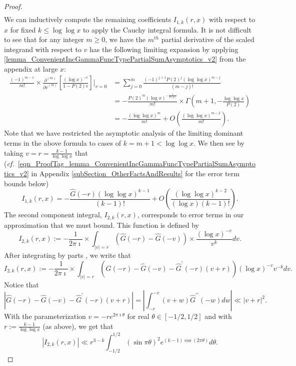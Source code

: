 \documentclass[11pt,reqno,a4letter]{article}
\numberwithin{figure}{section}
\numberwithin{table}{section}
\newcommand{\cf}{\textit{cf.\ }}
\theoremstyle{plain}
\numberwithin{theorem}{section}
\theoremstyle{definition}
\begin{document}
\begin{proof}
\begin{align*}
\end{align*}
We can inductively compute the remaining coefficients 
$I_{1,k}(r, x)$ with respect to 
$x$ for fixed $k \leq \log\log x$ to apply the Cauchy integral formula. 
It is not difficult to see that for any integer $m \geq 0$, 
we have the $m^{th}$ partial derivative of the scaled integrand with respect to $v$ 
has the following limiting expansion by applying 
\eqref{lemma_ConvenientIncGammaFuncTypePartialSumAsymptotics_v2} from the appendix at large $x$: 
\begin{align*} 
\frac{(-1)^{m-1}}{m!} \times \frac{\partial^{(m)}}{{\partial v}^{(m)}}\left[ 
     \frac{(\log x)^{-v}}{1 - P(2) v}\right] \Biggr\rvert_{v=0} & = 
     \sum_{j=0}^{m} \frac{(-1)^{j+1} P(2)^{j} (\log\log x)^{m-j}}{(m-j)!} \\ 
     & = 
     -\frac{P(2)^{m} (\log x)^{-\frac{1}{P(2)}}}{m!} \times 
     \Gamma\left(m+1, -\frac{\log\log x}{P(2)}\right) \\ 
     & = -\frac{(\log\log x)^m}{m!} + O\left(\frac{(\log\log x)^{m-2}}{m!}\right). 
\end{align*} 
Note that we have restricted the asymptotic analysis of the limiting dominant terms in 
the above formula to cases of $k = m + 1 < \log\log x$. 
We then see by taking $v = r = \frac{k-1}{\log\log x}$ that 
(\cf \eqref{eqn_ProofTag_lemma_ConvenientIncGammaFuncTypePartialSumAsymptotics_v2} 
in Appendix \ref{subSection_OtherFactsAndResults} for the error term bounds below) 
\[
I_{1,k}(r, x) = -\frac{\widehat{G}(-r) (\log\log x)^{k-1}}{(k-1)!} + O\left(
     \frac{(\log\log x)^{k-2}}{(\log x) (k-1)!}\right). 
\]
The second component integral, $I_{2,k}(r, x)$, corresponds to error terms in our approximation 
that we must bound. This function is defined by 
\[
I_{2,k}(r, x) := -\frac{1}{2\pi\imath} \times \int_{|v|=r} (\widehat{G}(-r) - \widehat{G}(-v)) 
     \times \frac{(\log x)^{-v}}{v^k} dv. 
\]
After integrating by parts \cite[\cf Thm.\ 7.19; \S 7.4]{MV}, we write that 
\[
I_{2,k}(r, x) := -\frac{1}{2\pi\imath} \times \int_{|v|=r} (\widehat{G}(-r) - \widehat{G}(-v) - 
     \widehat{G}^{\prime}(-r)(v+r)) 
     (\log x)^{-v} v^{-k} dv. 
\]
Notice that 
\[
\left\lvert \widehat{G}(-r) - \widehat{G}(-v) - \widehat{G}^{\prime}(-r)(v+r) \right\rvert = 
     \left\lvert \int_{-r}^{-v} 
     (v+w) \widehat{G}^{\prime\prime}(-w) dw \right\rvert 
     \ll |v+r|^2. 
\]
With the parameterization $v = -re^{2\pi\imath\theta}$ for real $\theta \in [-1/2,1/2]$ and 
with $r := \frac{k-1}{\log\log x}$ (as above), 
we get that 
\[
|I_{2,k}(r, x)| \ll r^{3-k} \int_{-1/2}^{1/2} (\sin \pi\theta)^2 e^{(k-1) \cos(2\pi\theta)} d\theta. 
\]
\end{proof}
\end{document}
